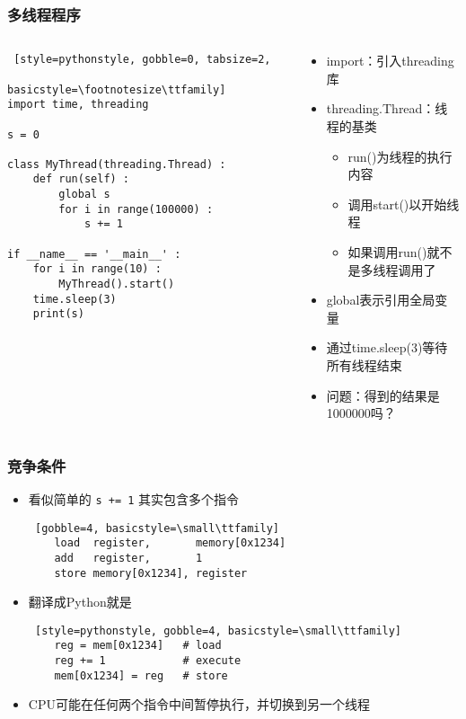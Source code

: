 \begin{frame} [fragile]
	\frametitle{多线程程序}
	\begin{columns}[T]
		\begin{column}[T]{.5\textwidth}
			\begin{lstlisting} [style=pythonstyle, gobble=0, tabsize=2,
								basicstyle=\footnotesize\ttfamily]
import time, threading

s = 0

class MyThread(threading.Thread) :
	def run(self) :
		global s
		for i in range(100000) :
			s += 1

if __name__ == '__main__' :
	for i in range(10) :
		MyThread().start()
	time.sleep(3)
	print(s)
			\end{lstlisting}
		\end{column}
		\begin{column}[T]{.5\textwidth}
			\begin{itemize}
			\item import：引入threading库
			\item threading.Thread：线程的基类
				\begin{itemize}
				\item run()为线程的执行内容
				\item 调用start()以开始线程
				\item 如果调用run()就不是多线程调用了
				\end{itemize}
			\item global表示引用全局变量
			\item 通过time.sleep(3)等待所有线程结束
			\item 问题：得到的结果是1000000吗？
			\end{itemize}
		\end{column}
	\end{columns}
\end{frame}

\begin{frame}[fragile]
	\frametitle{竞争条件}
	\begin{itemize}
	\item 看似简单的 \texttt{s += 1} 其实包含多个指令
	\begin{lstlisting} [gobble=4, basicstyle=\small\ttfamily]
	load  register,       memory[0x1234]
	add   register,       1
	store memory[0x1234], register
	\end{lstlisting}
	\item 翻译成Python就是
	\begin{lstlisting} [style=pythonstyle, gobble=4, basicstyle=\small\ttfamily]
	reg = mem[0x1234]	# load
	reg += 1			# execute
	mem[0x1234] = reg	# store
	\end{lstlisting}
	\item CPU可能在任何两个指令中间暂停执行，并切换到另一个线程
	\end{itemize}
\end{frame}

